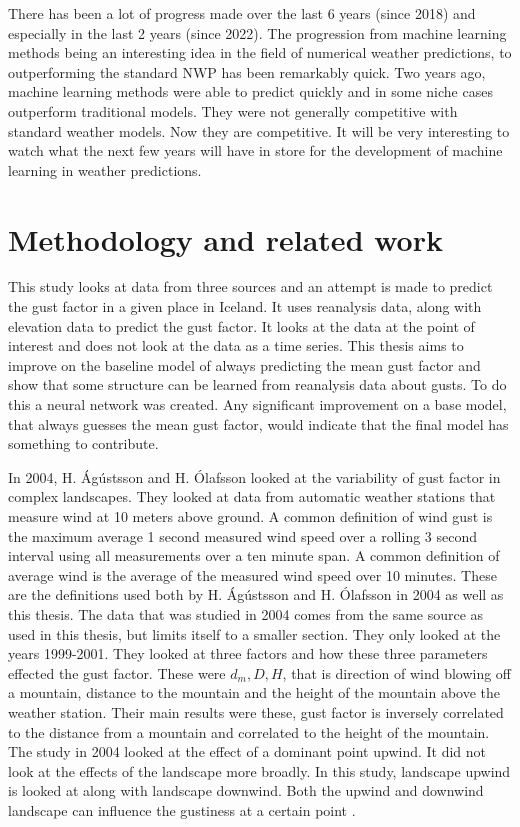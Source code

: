 There has been a lot of progress made over the last 6 years (since 2018) and especially in the last 2 years (since 2022)\cite{SecondRevolution}. The progression from machine learning methods being an interesting idea in the field of numerical weather predictions, to outperforming the standard NWP has been remarkably quick. Two years ago, machine learning methods were able to predict quickly and in some niche cases outperform traditional models. They were not generally competitive with standard weather models. Now they are competitive. It will be very interesting to watch what the next few years will have in store for the development of machine learning in weather predictions.

\section{Methodology and related work}
This study looks at data from three sources and an attempt is made to predict the gust factor in a given place in Iceland. It uses reanalysis data, along with elevation data to predict the gust factor. It looks at the data at the point of interest and does not look at the data as a time series. This thesis aims to improve on the baseline model of always predicting the mean gust factor and show that some structure can be learned from reanalysis data about gusts. To do this a neural network was created. Any significant improvement on a base model, that always guesses the mean gust factor, would indicate that the final model has something to contribute.

In 2004, H. Ágústsson and H. Ólafsson\cite{mean_gust_HA_HO} looked at the variability of gust factor in complex landscapes. They looked at data from automatic weather stations that measure wind at 10 meters above ground. A common definition of wind gust is the maximum average 1 second measured wind speed over a rolling 3 second interval using all measurements over a ten minute span. A common definition of average wind is the average of the measured wind speed over 10 minutes. These are the definitions used both by H. Ágústsson and H. Ólafsson in 2004 as well as this thesis. The data that was studied in 2004 comes from the same source as used in this thesis, but limits itself to a smaller section. They only looked at the years 1999-2001. They looked at three factors and how these three parameters effected the gust factor. These were $d_m, D, H$, that is direction of wind blowing off a mountain, distance to the mountain and the height of the mountain above the weather station. Their main results were these, gust factor is inversely correlated to the distance from a mountain and correlated to the height of the mountain. The study in 2004 looked at the effect of a dominant point upwind. It did not look at the effects of the landscape more broadly. In this study, landscape upwind is looked at along with landscape downwind. Both the upwind and downwind landscape can influence the gustiness at a certain point \cite{GNP_vidtal}.

